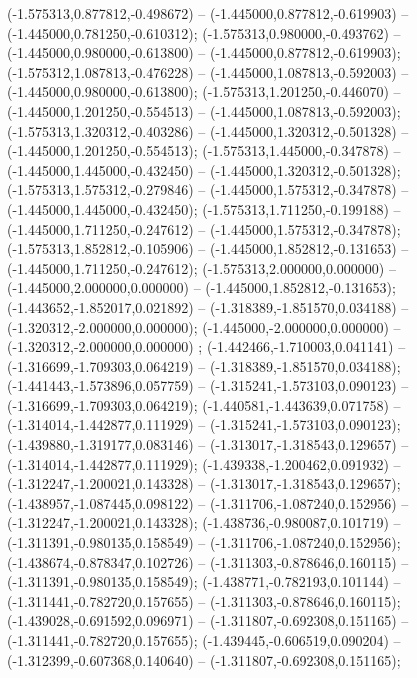  (-1.575313,0.877812,-0.498672) -- (-1.445000,0.877812,-0.619903) -- (-1.445000,0.781250,-0.610312);
 (-1.575313,0.980000,-0.493762) -- (-1.445000,0.980000,-0.613800) -- (-1.445000,0.877812,-0.619903);
 (-1.575312,1.087813,-0.476228) -- (-1.445000,1.087813,-0.592003) -- (-1.445000,0.980000,-0.613800);
 (-1.575313,1.201250,-0.446070) -- (-1.445000,1.201250,-0.554513) -- (-1.445000,1.087813,-0.592003);
 (-1.575313,1.320312,-0.403286) -- (-1.445000,1.320312,-0.501328) -- (-1.445000,1.201250,-0.554513);
 (-1.575313,1.445000,-0.347878) -- (-1.445000,1.445000,-0.432450) -- (-1.445000,1.320312,-0.501328);
 (-1.575313,1.575312,-0.279846) -- (-1.445000,1.575312,-0.347878) -- (-1.445000,1.445000,-0.432450);
 (-1.575313,1.711250,-0.199188) -- (-1.445000,1.711250,-0.247612) -- (-1.445000,1.575312,-0.347878);
 (-1.575313,1.852812,-0.105906) -- (-1.445000,1.852812,-0.131653) -- (-1.445000,1.711250,-0.247612);
 (-1.575313,2.000000,0.000000) -- (-1.445000,2.000000,0.000000) -- (-1.445000,1.852812,-0.131653);
 (-1.443652,-1.852017,0.021892) -- (-1.318389,-1.851570,0.034188) -- (-1.320312,-2.000000,0.000000);
 (-1.445000,-2.000000,0.000000) -- (-1.320312,-2.000000,0.000000) ;
 (-1.442466,-1.710003,0.041141) -- (-1.316699,-1.709303,0.064219) -- (-1.318389,-1.851570,0.034188);
 (-1.441443,-1.573896,0.057759) -- (-1.315241,-1.573103,0.090123) -- (-1.316699,-1.709303,0.064219);
 (-1.440581,-1.443639,0.071758) -- (-1.314014,-1.442877,0.111929) -- (-1.315241,-1.573103,0.090123);
 (-1.439880,-1.319177,0.083146) -- (-1.313017,-1.318543,0.129657) -- (-1.314014,-1.442877,0.111929);
 (-1.439338,-1.200462,0.091932) -- (-1.312247,-1.200021,0.143328) -- (-1.313017,-1.318543,0.129657);
 (-1.438957,-1.087445,0.098122) -- (-1.311706,-1.087240,0.152956) -- (-1.312247,-1.200021,0.143328);
 (-1.438736,-0.980087,0.101719) -- (-1.311391,-0.980135,0.158549) -- (-1.311706,-1.087240,0.152956);
 (-1.438674,-0.878347,0.102726) -- (-1.311303,-0.878646,0.160115) -- (-1.311391,-0.980135,0.158549);
 (-1.438771,-0.782193,0.101144) -- (-1.311441,-0.782720,0.157655) -- (-1.311303,-0.878646,0.160115);
 (-1.439028,-0.691592,0.096971) -- (-1.311807,-0.692308,0.151165) -- (-1.311441,-0.782720,0.157655);
 (-1.439445,-0.606519,0.090204) -- (-1.312399,-0.607368,0.140640) -- (-1.311807,-0.692308,0.151165);
